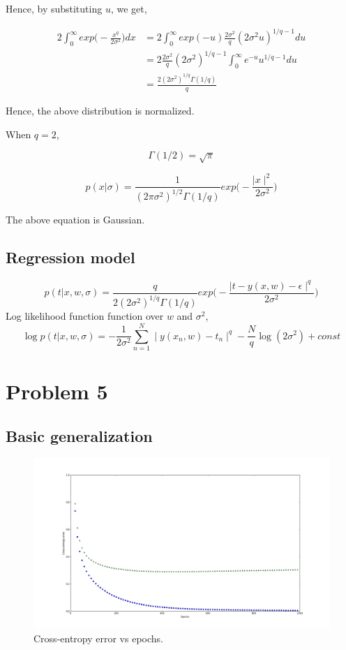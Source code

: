 \documentclass{article}
\begin{document}
Hence, by substituting $u$, we get,

\begin{align*}
2 \int_{0}^{\infty} exp \bigg( - \frac{x^q}{2\sigma^2} \bigg) dx &= 2 \int_{0}^{\infty} exp(- u) \frac{2\sigma^2}{q} (2\sigma^2u)^{1/q - 1}  du \\
&= 2 \frac{2\sigma^2}{q} (2\sigma^2)^{1/q - 1} \int_{0}^{\infty} e^{-u}  u^{1/q - 1}  du \\
&= \frac{2(2\sigma^2)^{1/q}\Gamma(1/q)}{q}
\end{align*}

Hence, the above distribution is normalized.

When $q=2$,

\[
\Gamma(1/2) = \sqrt{\pi}
\]

\[
p(x|\sigma) = \frac{1}{(2\pi\sigma^2)^{1/2}\Gamma(1/q)} exp \bigg(-\frac{\mid x \mid^2}{2\sigma^2} \bigg)
\]

The above equation is Gaussian.

\subsection*{Regression model}

\[
p(t|x, w, \sigma) = \frac{q}{2(2\sigma^2)^{1/q}\Gamma(1/q)} exp \bigg( - \frac{\mid t - y(x,w) - \epsilon \mid^q}{2\sigma^2} \bigg) 
\]
Log likelihood function function over $w$ and $\sigma^2$,
\[
\log p(t|x, w, \sigma) = -\frac{1}{2\sigma^2} \sum_{n=1}^{N} \mid y(x_n, w) - t_n \mid ^ q - \frac{N}{q} \log (2\sigma^2) + const
\]


\section{Problem 5}

\subsection{Basic generalization}

\begin{figure}[!h]
  \centering
  \includegraphics[width=\textwidth]{figures/5a}
  \caption{Cross-entropy error vs epochs.}
  \label{fig:5a}
\end{figure}
\end{document}
